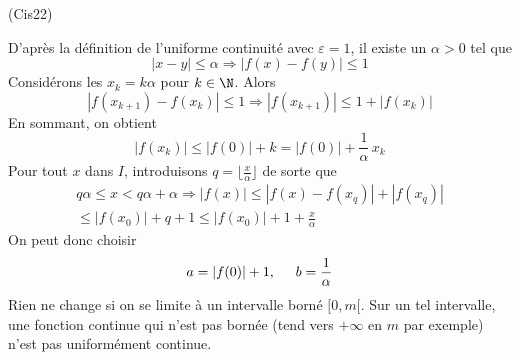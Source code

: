 \begin{tiny}(Cis22)\end{tiny} D'après la définition de l'uniforme continuité avec $\varepsilon=1$, il existe un $\alpha>0$ tel que 
\begin{displaymath}
|x-y|\leq \alpha \Rightarrow  |f(x)-f(y)|\leq 1 
\end{displaymath}
Considérons les $x_k = k\alpha$ pour $k\in\N$. Alors 
\begin{displaymath}
 |f(x_{k+1})-f(x_k)|\leq 1 
 \Rightarrow
|f(x_{k+1})| \leq 1 + |f(x_k)| 
\end{displaymath}
En sommant, on obtient
\begin{displaymath}
 |f(x_k)|\leq |f(0)| + k = |f(0)| + \frac{1}{\alpha}\, x_k
\end{displaymath}
Pour tout $x$ dans $I$, introduisons $q= \lfloor \frac{x}{\alpha} \rfloor$ de sorte que
\begin{multline*}
q\alpha \leq x < q\alpha+ \alpha 
\Rightarrow
 |f(x)|\leq |f(x)-f(x_q)|+|f(x_q)|\\
 \leq |f(x_0)| + q + 1 
\leq |f(x_0)|  + 1 + \frac{x}{\alpha}
\end{multline*}
On peut donc choisir
\begin{displaymath}
a = |f(0)| +1, \hspace{0.5cm} b=\frac{1}{\alpha}
\end{displaymath}
Rien ne change si on se limite à un intervalle borné $[0,m[$.\newline
Sur un tel intervalle, une fonction continue qui n'est pas bornée (tend vers $+\infty$ en $m$ par exemple) n'est pas uniformément continue.